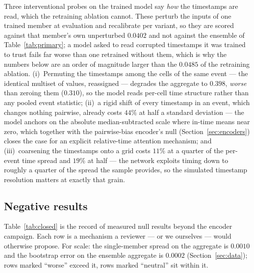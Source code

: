 \documentclass[11pt,a4paper]{article}
\begin{document}
Three interventional probes on the trained model say \emph{how} the
timestamps are read, which the retraining ablation cannot. These perturb the
inputs of one trained member at evaluation and recalibrate per variant, so
they are scored against that member's own unperturbed $0.0402$ and not
against the ensemble of Table~\ref{tab:primary}; a model asked to read
corrupted timestamps it was trained to trust fails far worse than one
retrained without them, which is why the numbers below are an order of
magnitude larger than the $0.0485$ of the retraining ablation.
(i)~Permuting the timestamps among the cells of the same event
--- the identical multiset of values, reassigned --- degrades the
aggregate to $0.398$, \emph{worse} than zeroing them ($0.310$), so the
model reads per-cell time structure rather than any pooled event
statistic; (ii)~a rigid shift of every timestamp in an event, which
changes nothing pairwise, already costs $44\%$ at half a standard
deviation --- the model anchors on the absolute median-subtracted scale
where in-time means near zero, which together with the pairwise-bias
encoder's null (Section~\ref{sec:encoders}) closes the case for an
explicit relative-time attention mechanism; and (iii)~coarsening the
timestamps onto a grid costs $11\%$ at a quarter of the per-event time
spread and $19\%$ at half --- the network exploits timing down to roughly
a quarter of the spread the sample provides, so the simulated timestamp
resolution matters at exactly that grain.

\subsection{Negative results}
\label{sec:closed}

Table~\ref{tab:closed} is the record of measured null results beyond the encoder
campaign. Each row is a mechanism a reviewer --- or we ourselves --- would
otherwise propose. For scale: the single-member spread on the aggregate is
$0.0010$ and the bootstrap error on the ensemble aggregate is $0.0002$
(Section~\ref{sec:data}); rows marked ``worse'' exceed it, rows marked
``neutral'' sit within it.
\end{document}
